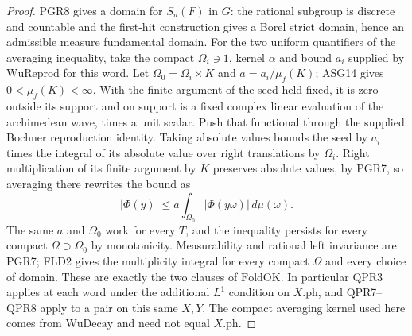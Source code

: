 \begin{proof}
PGR8 gives a domain for $S_u(F)$ in $G$: the rational subgroup is
discrete and countable and the first-hit construction gives a Borel
strict domain, hence an admissible measure fundamental domain.
For the two uniform quantifiers of the averaging inequality, take
the compact $\Omega_i\ni1$, kernel $\alpha$ and bound $a_i$ supplied
by $\mathrm{WuReprod}$ for this word. Let
$\Omega_0=\Omega_i\times K$ and $a=a_i/\mu_f(K)$; ASG14 gives
$0<\mu_f(K)<\infty$. With the finite argument of the seed held fixed,
it is zero outside its support and on support is a fixed complex
linear evaluation of the archimedean wave, times a unit scalar.
Push that functional through the supplied Bochner reproduction
identity. Taking absolute values bounds the seed by $a_i$ times
the integral of its absolute value over right translations by
$\Omega_i$. Right multiplication of its finite argument by $K$
preserves absolute values, by PGR7, so averaging there rewrites
the bound as
\[
      |\Phi(y)|\le a\int_{\Omega_0}|\Phi(y\omega)|\,d\mu(\omega).
\]
The same $a$ and $\Omega_0$ work for every $T$, and the inequality
persists for every compact $\Omega\supset\Omega_0$ by monotonicity.
Measurability and rational left invariance are PGR7; FLD2 gives the
multiplicity integral for every compact $\Omega$ and every choice
of domain. These are exactly the two clauses of $\mathrm{FoldOK}$.
In particular QPR3 applies at each word under the additional
$L^1$ condition on $X.\mathrm{ph}$, and QPR7--QPR8 apply to a
pair on this same $X,Y$. The compact averaging kernel used here
comes from $\mathrm{WuDecay}$ and need not equal $X.\mathrm{ph}$.
\end{proof}
